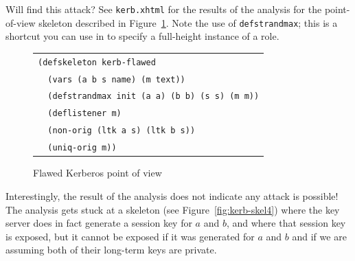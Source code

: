 Will {\cpsa} find this attack?  See \texttt{kerb.xhtml} for the
results of the analysis for the point-of-view skeleton described in
Figure~\ref{fig:kerb-flawed-pov}.  Note the use of
\texttt{defstrandmax}; this is a shortcut you
can use in {\cpsa} to specify a full-height instance of a role.

\begin{figure}
\centering
\begin{tabular}{l}
\verb|(defskeleton kerb-flawed|\\
\verb|  (vars (a b s name) (m text))|\\
\verb|  (defstrandmax init (a a) (b b) (s s) (m m))|\\
\verb|  (deflistener m)|\\
\verb|  (non-orig (ltk a s) (ltk b s))|\\
\verb|  (uniq-orig m))|\\
\end{tabular}
\caption{Flawed Kerberos point of view}
\label{fig:kerb-flawed-pov}
\end{figure}

Interestingly, the result of the analysis does not indicate any attack
is possible!  The analysis gets stuck at a skeleton (see
Figure~\ref{fig:kerb-skel4}) where the key server does in fact
generate a session key for $a$ and $b$, and where that session key is
exposed, but it cannot be exposed if it was generated for $a$ and $b$
and if we are assuming both of their long-term keys are private.

